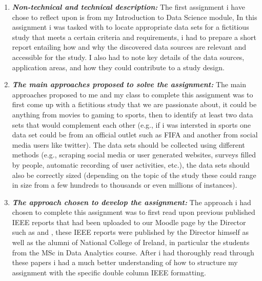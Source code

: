 \documentclass[12pt]{article}
\begin{document}
\begin{enumerate}
\item \textbf{\emph{Non-technical and technical description: }} The first assignment i have chose to reflect upon is from my Introduction to Data Science module, In this assignment i was tasked with to locate appropriate data sets for a fictitious study that meets a certain criteria and requirements, i had to prepare a short report entailing how and why the discovered data sources are relevant and accessible for the study. I also had to note key details of the data sources, application areas, and how they could contribute to a study design.



\item \textbf{\emph{The main approaches proposed to solve the assignment: }} The main approaches proposed to me and my class to complete this assignment was to first come up with a fictitious study that we are passionate about, it could be anything from movies to gaming to sports, 
then to identify at least two data sets that would complement each other (e.g., if i was intersted in sports one data set could be from an official outlet such as FIFA and another from social media users like twitter).
The data sets should be collected using different methods (e.g., scraping social media or user generated websites, surveys filled by people, automatic recording of user activities, etc.),
the data sets should also be correctly sized (depending on the topic of the study these could range in size from a few hundreds to thousands or even millions of instances).
\newpage



\item \textbf{\emph{The approach chosen to develop the assignment: }} The approach i had chosen to complete this assignment was to first read upon previous published IEEE reports that had been uploaded to our Moodle page by the Director such as \cite{arghir-nicolae_moldovann_cloud-based_2018} and \cite{arghir-nicolae_moldovann_vqamap_2016}, these IEEE reports were published by the Director himself as well as the alumni of National College of Ireland, in particular the students from the MSc in Data Analytics course. After i had thoroughly read through these papers i had a much better understanding of how to structure my assignment with the specific double column IEEE formatting.


\end{enumerate}
\end{document}
